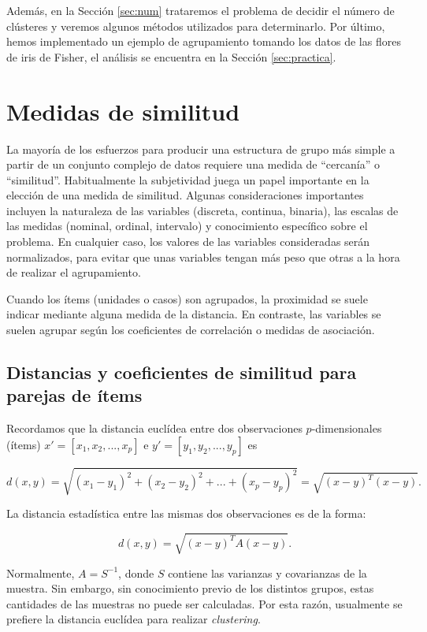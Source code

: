 \documentclass[a4paper, 20pt]{article}
\begin{document}
Además, en la Sección \ref{sec:num} trataremos el problema de decidir el número de clústeres y veremos algunos métodos utilizados para determinarlo. Por último, hemos implementado un ejemplo de agrupamiento tomando los datos de las flores de iris de Fisher, el análisis se encuentra en la Sección \ref{sec:practica}.

\section{Medidas de similitud}\label{sec:medidas}

La mayoría de los esfuerzos para producir una estructura de grupo más simple a partir de un conjunto complejo de datos requiere una medida de ``cercanía'' o  ``similitud''. Habitualmente la subjetividad juega un papel importante en la elección de una medida de similitud. Algunas consideraciones importantes incluyen la naturaleza de las variables (discreta, continua, binaria), las escalas de las medidas (nominal, ordinal, intervalo) y conocimiento específico sobre el problema. En cualquier caso, los valores de las variables consideradas serán normalizados, para evitar que unas variables tengan más peso que otras a la hora de realizar el agrupamiento.

Cuando los ítems (unidades o casos) son agrupados, la proximidad se suele indicar mediante alguna medida de la distancia. En contraste, las variables se suelen agrupar según los coeficientes de correlación o medidas de asociación.

\subsection{Distancias y coeficientes de similitud para parejas de ítems}

Recordamos que la distancia euclídea entre dos observaciones $p$-dimensionales (ítems) $x' = [x_1,x_2,...,x_p]$ e $y'=[y_1,y_2,...,y_p]$ es

\[d(x,y) = \sqrt{(x_1-y_1)^2+(x_2-y_2)^2+...+(x_p-y_p)^2}=\sqrt{(x-y)^T(x-y)}.\]

La distancia estadística entre las mismas dos observaciones es de la forma:

$$d(x,y)=\sqrt{(x-y)^TA(x-y)}. $$

Normalmente, $A=S^{-1}$, donde $S$ contiene las varianzas y covarianzas de la muestra. Sin embargo, sin conocimiento previo de los distintos grupos, estas cantidades de las muestras no puede ser calculadas. Por esta razón, usualmente se prefiere la distancia euclídea para realizar \textit{clustering}.\\
\end{document}
